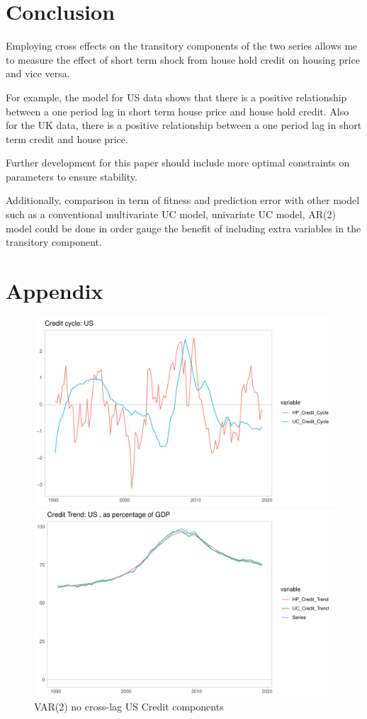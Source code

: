 \documentclass[fleqn]{article}
\begin{document}
\begin{outline}[enumerate]
\clearpage
\section{Conclusion}
Employing cross effects on the transitory components of the two series allows me to measure the effect of short term shock from house hold credit on housing price and vice versa.  

For example, the model for US data shows that there is a positive relationship between a one period lag in short term house price and house hold credit. Also for the UK data, there is a positive relationship between a one period lag in short term credit and house price.

Further development for this paper should include more optimal constraints on parameters to ensure stability. 

Additionally, comparison in term of fitness and prediction error with other model such as a conventional multivariate UC model, univariate UC model, AR(2) model could be done in order gauge the benefit of including extra variables in the transitory component.


\section*{Appendix}
\clearpage

\begin{figure}[h!]
\caption{VAR(2) no cross-lag US Credit components}	
\centerline{\includegraphics[scale=0.7]{../Output/Graphs/Credit_cycle_US.pdf}}
\centerline{\includegraphics[scale=0.7]{../Output/Graphs/Credit_trend_US.pdf}}
\end{figure}


\end{outline}
\end{document}
